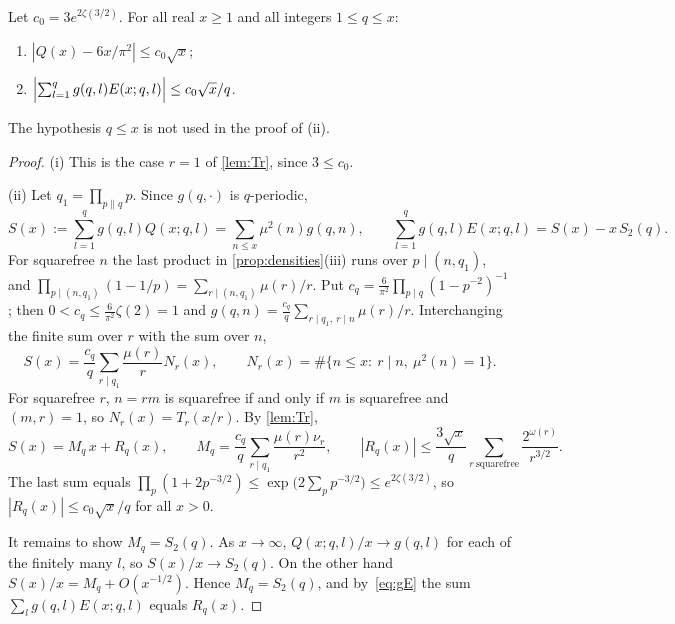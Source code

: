 \begin{proposition}\label{prop:trivial}
Let $c_0=3e^{2\zeta(3/2)}$. For all real $x\ge1$ and all integers $1\le q\le x$:
\begin{enumerate}[label=\textup{(\roman*)}]
\item $|Q(x)-6x/\pi^2|\le c_0\sqrt x$;
\item $\Bigl|\sum_{l=1}^qg(q,l)E(x;q,l)\Bigr|\le c_0\sqrt x/q$.
\end{enumerate}
\end{proposition}

The hypothesis $q\le x$ is not used in the proof of (ii).

\begin{proof}
(i) This is the case $r=1$ of \cref{lem:Tr}, since $3\le c_0$.

(ii) Let $q_1=\prod_{p\|q}p$. Since $g(q,\cdot)$ is $q$-periodic,
\begin{equation}\label{eq:gE}
S(x):=\sum_{l=1}^qg(q,l)Q(x;q,l)=\sum_{n\le x}\mu^2(n)g(q,n),\qquad \sum_{l=1}^qg(q,l)E(x;q,l)=S(x)-x\,S_2(q).
\end{equation}
For squarefree $n$ the last product in \cref{prop:densities}(iii) runs over $p\mid(n,q_1)$, and $\prod_{p\mid(n,q_1)}(1-1/p)=\sum_{r\mid(n,q_1)}\mu(r)/r$. Put $c_q=\frac6{\pi^2}\prod_{p\mid q}(1-p^{-2})^{-1}$; then $0<c_q\le\frac6{\pi^2}\zeta(2)=1$ and $g(q,n)=\frac{c_q}{q}\sum_{r\mid q_1,\ r\mid n}\mu(r)/r$. Interchanging the finite sum over $r$ with the sum over $n$,
\[
S(x)=\frac{c_q}{q}\sum_{r\mid q_1}\frac{\mu(r)}{r}N_r(x),\qquad N_r(x)=\#\{n\le x:\ r\mid n,\ \mu^2(n)=1\}.
\]
For squarefree $r$, $n=rm$ is squarefree if and only if $m$ is squarefree and $(m,r)=1$, so $N_r(x)=T_r(x/r)$. By \cref{lem:Tr},
\[
S(x)=M_q\,x+R_q(x),\qquad M_q=\frac{c_q}{q}\sum_{r\mid q_1}\frac{\mu(r)\nu_r}{r^2},
\qquad
|R_q(x)|\le\frac{3\sqrt x}{q}\sum_{r\ \mathrm{squarefree}}\frac{2^{\omega(r)}}{r^{3/2}}.
\]
The last sum equals $\prod_p(1+2p^{-3/2})\le\exp\bigl(2\sum_pp^{-3/2}\bigr)\le e^{2\zeta(3/2)}$, so $|R_q(x)|\le c_0\sqrt x/q$ for all $x>0$.

It remains to show $M_q=S_2(q)$. As $x\to\infty$, $Q(x;q,l)/x\to g(q,l)$ for each of the finitely many $l$, so $S(x)/x\to S_2(q)$. On the other hand $S(x)/x=M_q+O(x^{-1/2})$. Hence $M_q=S_2(q)$, and by~\eqref{eq:gE} the sum $\sum_lg(q,l)E(x;q,l)$ equals $R_q(x)$.
\end{proof}
